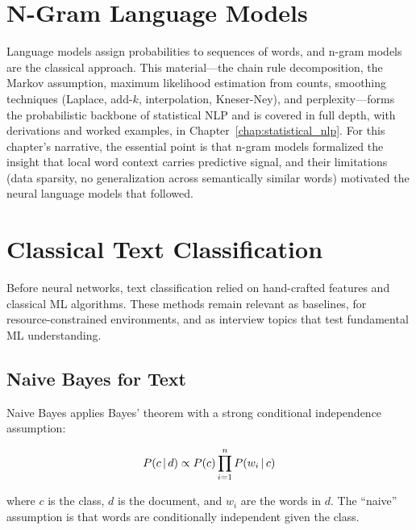\section{N-Gram Language Models}
\label{sec:ngram_forward}

Language models assign probabilities to sequences of words, and n-gram models are the
classical approach. This material---the chain rule decomposition, the Markov assumption,
maximum likelihood estimation from counts, smoothing techniques (Laplace, add-$k$,
interpolation, Kneser-Ney), and perplexity---forms the probabilistic backbone of
statistical NLP and is covered in full depth, with derivations and worked examples, in
Chapter~\ref{chap:statistical_nlp}. For this chapter's narrative, the essential point is
that n-gram models formalized the insight that local word context carries predictive
signal, and their limitations (data sparsity, no generalization across semantically
similar words) motivated the neural language models that followed.

\section{Classical Text Classification}
\label{sec:classical_classification}

Before neural networks, text classification relied on hand-crafted features and classical
ML algorithms. These methods remain relevant as baselines, for resource-constrained
environments, and as interview topics that test fundamental ML understanding.

\subsection{Naive Bayes for Text}
\label{sec:naive_bayes}

Naive Bayes applies Bayes' theorem with a strong conditional independence assumption:

\begin{equation}
    P(c \,|\, d) \propto P(c) \prod_{i=1}^{n} P(w_i \,|\, c)
    \label{eq:naive_bayes}
\end{equation}

where $c$ is the class, $d$ is the document, and $w_i$ are the words in $d$. The
``naive'' assumption is that words are conditionally independent given the class.


